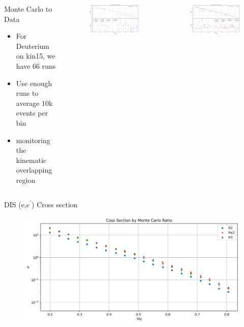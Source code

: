 \documentclass{beamer}
\begin{document}
\begin{frame}
\begin{columns}
\begin{block}{Monte Carlo to Data}
	\begin{itemize}
		\item For Deuterium on kin15, we have 66 runs
		\item Use enough runs to average 10k events per bin
		\item monitoring the kinematic overlapping region
	\end{itemize}
\end{block}
\vspace{-20pt}
\begin{figure}
	\includegraphics[width=7.5cm]{../images/D2_all}
\end{figure}
\vspace{-40pt}
\begin{figure}
	\includegraphics[width=7.5cm]{../images/He3_all}
\end{figure}
\end{columns}

\end{frame}

\begin{frame}
\begin{block}{DIS (e,$e^\prime$) Cross section}
\begin{figure}
\includegraphics[width=12.0cm]{../images/all_final}
\end{figure}

\end{block}

\end{frame}
\end{document}
